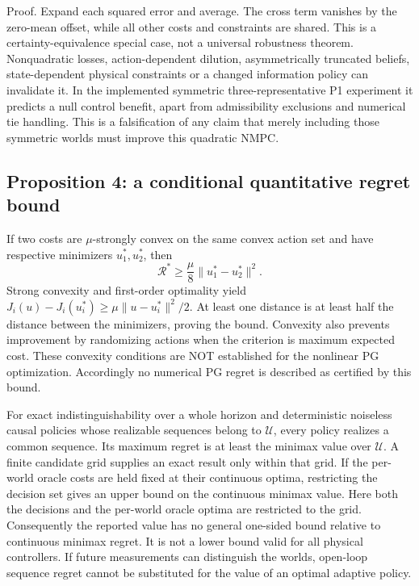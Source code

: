 \documentclass[
  11pt,
]{article}
\begin{document}
Proof. Expand each squared error and average. The cross term vanishes by
the zero-mean offset, while all other costs and constraints are shared.
This is a certainty-equivalence special case, not a universal robustness
theorem. Nonquadratic losses, action-dependent dilution, asymmetrically
truncated beliefs, state-dependent physical constraints or a changed
information policy can invalidate it. In the implemented symmetric
three-representative P1 experiment it predicts a null control benefit,
apart from admissibility exclusions and numerical tie handling. This is
a falsification of any claim that merely including those symmetric
worlds must improve this quadratic NMPC.

\hypertarget{proposition-4-a-conditional-quantitative-regret-bound}{%
\subsection{Proposition 4: a conditional quantitative regret
bound}\label{proposition-4-a-conditional-quantitative-regret-bound}}

If two costs are \(\mu\)-strongly convex on the same convex action set
and have respective minimizers \(u_1^*,u_2^*\), then
\[\mathcal R^*\geq\frac{\mu}{8}\|u_1^*-u_2^*\|^2.\] Strong convexity and
first-order optimality yield
\(J_i(u)-J_i(u_i^*)\geq\mu\|u-u_i^*\|^2/2\). At least one distance is at
least half the distance between the minimizers, proving the bound.
Convexity also prevents improvement by randomizing actions when the
criterion is maximum expected cost. These convexity conditions are NOT
established for the nonlinear PG optimization. Accordingly no numerical
PG regret is described as certified by this bound.

For exact indistinguishability over a whole horizon and deterministic
noiseless causal policies whose realizable sequences belong to
\(\mathcal U\), every policy realizes a common sequence. Its maximum
regret is at least the minimax value over \(\mathcal U\). A finite
candidate grid supplies an exact result only within that grid. If the
per-world oracle costs are held fixed at their continuous optima,
restricting the decision set gives an upper bound on the continuous
minimax value. Here both the decisions and the per-world oracle optima
are restricted to the grid. Consequently the reported value has no
general one-sided bound relative to continuous minimax regret. It is not
a lower bound valid for all physical controllers. If future measurements
can distinguish the worlds, open-loop sequence regret cannot be
substituted for the value of an optimal adaptive policy.
\end{document}
